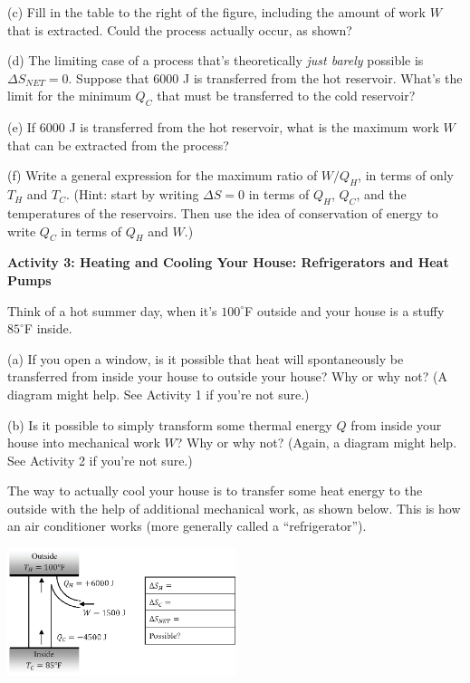(c) Fill in the table to the right of the figure, including the amount of work $W$ that is extracted.  Could the process actually occur, as shown?
\answerspace{0.2 in}

(d) The limiting case of a process that's theoretically \textit{just barely} possible is $\Delta S_{NET} = 0$.  Suppose that 6000 J is transferred from the hot reservoir.  What's the limit for the minimum $Q_C$ that must be transferred to the cold reservoir?
\answerspace{0.2 in}

(e) If  6000 J is transferred from the hot reservoir, what is the maximum work $W$ that can be extracted from the process?
\answerspace{0.2 in}

\pagebreak[2]
(f) Write a general expression for the maximum ratio of $W/Q_H$, in terms of only $T_H$ and $T_C$.  (Hint: start by writing $\Delta S = 0$ in terms of $Q_H$, $Q_C$, and the temperatures of the reservoirs.  Then use the idea of conservation of energy to write $Q_C$ in terms of $Q_H$ and $W$.)
\answerspace{1.5 in}

\textbf{Activity 3: Heating and Cooling Your House: Refrigerators and Heat Pumps}

Think of a hot summer day, when it's $100^\circ$F outside and your house is a stuffy $85^\circ$F inside.  

(a) If you open a window, is it possible that heat will spontaneously be transferred from inside your house to outside your house?  Why or why not?  (A diagram might help.  See Activity 1 if you're not sure.)
\answerspace{1.2 in}

(b) Is it possible to simply transform some thermal energy $Q$ from inside your house into mechanical work $W$?  Why or why not?  (Again, a diagram might help.  See Activity 2 if you're not sure.)
\answerspace{1.2 in}

The way to actually cool your house is to transfer some heat energy to the outside with the help of additional mechanical work, as shown below.  This is how an air conditioner works (more generally called a ``refrigerator'').

\begin{center}
\vspace{-0.3 in}
\includegraphics[width=0.5\textwidth]{entropy_is_it_possible/fig6.eps}
\vspace{-0.4 in}
\end{center}

